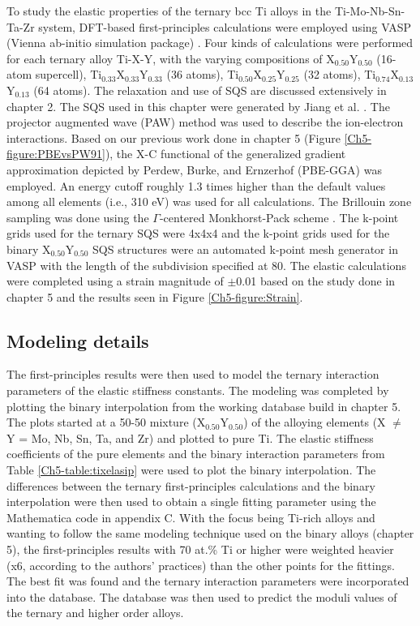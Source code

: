 To study the elastic properties of the ternary bcc Ti alloys in the Ti-Mo-Nb-Sn-Ta-Zr system, DFT-based first-principles calculations were employed using VASP (Vienna ab-initio simulation package) \cite{Kresse1996,Kresse1999}. Four kinds of calculations were performed for each ternary alloy Ti-X-Y, with the varying compositions of X$_{0.50}$Y$_{0.50}$ (16-atom supercell), Ti$_{0.33}$X$_{0.33}$Y$_{0.33}$ (36 atoms), Ti$_{0.50}$X$_{0.25}$Y$_{0.25}$ (32 atoms), Ti$_{0.74}$X$_{0.13}$Y$_{0.13}$ (64 atoms). The relaxation and use of SQS are discussed extensively in chapter 2. The SQS used in this chapter were generated by Jiang et al. \cite{Jiang2004,Jiang2009}. The projector augmented wave (PAW) method was used to describe the ion-electron interactions. Based on our previous work done in chapter 5 (Figure \ref{Ch5-figure:PBEvsPW91}), the X-C functional of the generalized gradient approximation depicted by Perdew, Burke, and Ernzerhof (PBE-GGA) \cite{Perdew1996a} was employed. An energy cutoff roughly 1.3 times higher than the default values among all elements (i.e., 310 eV) was used for all calculations. The Brillouin zone sampling was done using the $\Gamma$-centered Monkhorst-Pack scheme \cite{Monkhorst1976a}. The k-point grids used for the ternary SQS were 4x4x4 and the k-point grids used for the binary X$_{0.50}$Y$_{0.50}$ SQS structures were an automated k-point mesh generator in VASP with the length of the subdivision specified at 80. The elastic calculations were completed using a strain magnitude of $\pm$0.01 based on the study done in chapter 5 and the results seen in Figure \ref{Ch5-figure:Strain}.

\subsection{Modeling details}

The first-principles results were then used to model the ternary interaction parameters of the elastic stiffness constants. The modeling was completed by plotting the binary interpolation from the working database build in chapter 5. The plots started at a 50-50 mixture (X$_{0.50}$Y$_{0.50}$) of the alloying elements (X $\neq$ Y = Mo, Nb, Sn, Ta, and Zr) and plotted to pure Ti. The elastic stiffness coefficients of the pure elements and the binary interaction parameters from Table \ref{Ch5-table:tixelasip} were used to plot the binary interpolation. The differences between the ternary first-principles calculations and the binary interpolation were then used to obtain a single fitting parameter using the Mathematica code in appendix C. With the focus being Ti-rich alloys and wanting to follow the same modeling technique used on the binary alloys (chapter 5), the first-principles results with 70 at.\% Ti or higher were weighted heavier (x6, according to the authors' practices) than the other points for the fittings. The best fit was found and the ternary interaction parameters were incorporated into the database. The database was then used to predict the moduli values of the ternary and higher order alloys. 

